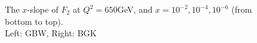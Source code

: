 \documentclass[11pt]{article}
\begin{document}
\begin{figure}[H]
\caption{The $x$-slope of $F_2$  at $Q^2=650$GeV, and $x=10^{-2},10^{-4}, 10^{-6}$ (from bottom to top).\\Left: GBW, Right: BGK}
\label{slope}
\end{figure}
\end{document}
